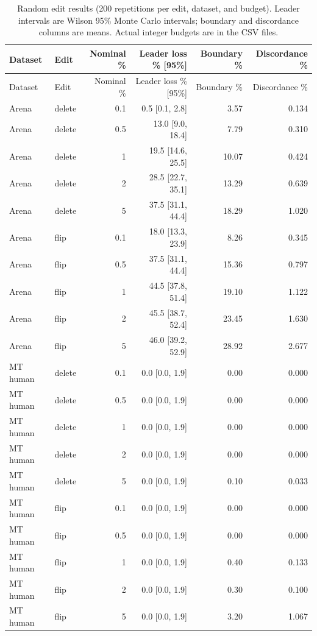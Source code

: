 \begin{longtable}{llrrrr}\caption{Random edit results (200 repetitions per edit, dataset, and budget). Leader intervals are Wilson 95\% Monte Carlo intervals; boundary and discordance columns are means. Actual integer budgets are in the CSV files.}\label{tab:randomfull}\\ \toprule Dataset & Edit & Nominal \% & Leader loss \% [95\%] & Boundary \% & Discordance \% \\ \midrule\endfirsthead \toprule Dataset & Edit & Nominal \% & Leader loss \% [95\%] & Boundary \% & Discordance \% \\ \midrule\endhead
Arena & delete & 0.1 & 0.5 [0.1, 2.8] & 3.57 & 0.134 \\
Arena & delete & 0.5 & 13.0 [9.0, 18.4] & 7.79 & 0.310 \\
Arena & delete & 1 & 19.5 [14.6, 25.5] & 10.07 & 0.424 \\
Arena & delete & 2 & 28.5 [22.7, 35.1] & 13.29 & 0.639 \\
Arena & delete & 5 & 37.5 [31.1, 44.4] & 18.29 & 1.020 \\
Arena & flip & 0.1 & 18.0 [13.3, 23.9] & 8.26 & 0.345 \\
Arena & flip & 0.5 & 37.5 [31.1, 44.4] & 15.36 & 0.797 \\
Arena & flip & 1 & 44.5 [37.8, 51.4] & 19.10 & 1.122 \\
Arena & flip & 2 & 45.5 [38.7, 52.4] & 23.45 & 1.630 \\
Arena & flip & 5 & 46.0 [39.2, 52.9] & 28.92 & 2.677 \\
MT human & delete & 0.1 & 0.0 [0.0, 1.9] & 0.00 & 0.000 \\
MT human & delete & 0.5 & 0.0 [0.0, 1.9] & 0.00 & 0.000 \\
MT human & delete & 1 & 0.0 [0.0, 1.9] & 0.00 & 0.000 \\
MT human & delete & 2 & 0.0 [0.0, 1.9] & 0.00 & 0.000 \\
MT human & delete & 5 & 0.0 [0.0, 1.9] & 0.10 & 0.033 \\
MT human & flip & 0.1 & 0.0 [0.0, 1.9] & 0.00 & 0.000 \\
MT human & flip & 0.5 & 0.0 [0.0, 1.9] & 0.00 & 0.000 \\
MT human & flip & 1 & 0.0 [0.0, 1.9] & 0.40 & 0.133 \\
MT human & flip & 2 & 0.0 [0.0, 1.9] & 0.30 & 0.100 \\
MT human & flip & 5 & 0.0 [0.0, 1.9] & 3.20 & 1.067 \\

\end{longtable}
